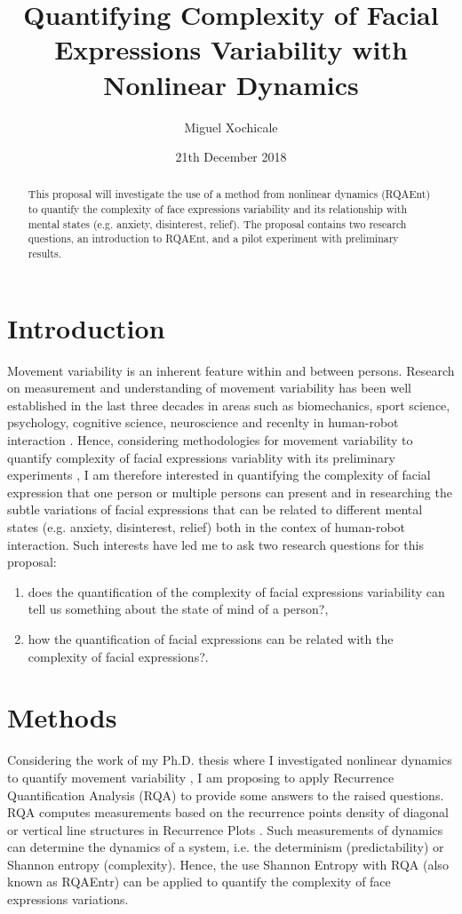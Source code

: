 \documentclass[12pt]{article}
\title{Quantifying Complexity of Facial Expressions 
Variability with Nonlinear Dynamics}
\author{Miguel Xochicale\\ 
}
\date{21th December 2018}
\begin{document}
\maketitle


\begin{abstract}
This proposal will investigate the use of a method from nonlinear dynamics (RQAEnt) 
 to quantify the complexity of face expressions variability and its relationship
with mental states (e.g. anxiety, disinterest, relief).
The proposal contains two research questions,
an introduction to RQAEnt, and a pilot experiment with preliminary results.
\end{abstract}


\section{Introduction}
Movement variability is an inherent feature within and between persons. 
Research on measurement and understanding of movement variability has been 
well established in the last three decades in areas such as biomechanics, 
sport science, psychology, cognitive science, neuroscience and recenlty
in human-robot interaction \cite{2018arXiv181009249X}.
Hence, considering methodologies for movement variability 
to quantify complexity of facial expressions variablity 
with its preliminary experiments \cite{MPXochicale_CERE2018},
I am therefore interested in quantifying the complexity 
of facial expression that one person or multiple persons 
can present and in researching 
the subtle variations of facial expressions that can be related to different 
mental states  (e.g. anxiety, disinterest, relief) \cite{back2014}
both in the contex of human-robot interaction.
Such interests have led me to ask two research questions for this
proposal: 
\begin{enumerate}[label=(\roman*)]
 \item does the quantification of the complexity of facial expressions 
	variability can tell us something about the state of mind of a person?, 
\item how the quantification of facial expressions can be related with 
the complexity of facial expressions?.
\end{enumerate}

\section{Methods}
Considering the work of my Ph.D. thesis where I investigated nonlinear dynamics
to quantify movement variability \cite{XochicalePhDThesis2018},
I am proposing to apply Recurrence Quantification Analysis (RQA) to
provide some answers to the raised questions.
RQA computes measurements based on the recurrence points density of diagonal 
or vertical line structures in Recurrence Plots \cite{marwan2007}. 
Such measurements of dynamics can determine the dynamics of a system,
i.e. the determinism (predictability) or Shannon entropy (complexity).
Hence, the use Shannon Entropy with RQA (also known as RQAEntr)
can be applied to quantify the complexity of face expressions variations. 
\end{document}
